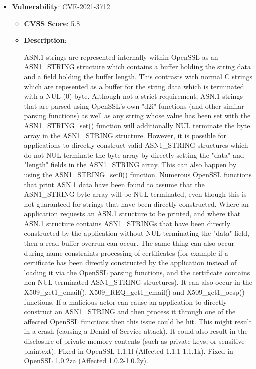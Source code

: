\documentclass{article}
\begin{document}
\begin{itemize}
        \item \textbf{Vulnerability}: CVE-2021-3712
        \begin{itemize}
            \item \textbf{CVSS Score}:  5.8 
            \item \textbf{Description}:
            \parbox[t]{0.9\linewidth}{
                \ttfamily ASN.1 strings are represented internally within OpenSSL as an ASN1\_STRING structure which contains a buffer holding the string data and a field holding the buffer length. This contrasts with normal C strings which are repesented as a buffer for the string data which is terminated with a NUL (0) byte. Although not a strict requirement, ASN.1 strings that are parsed using OpenSSL's own "d2i" functions (and other similar parsing functions) as well as any string whose value has been set with the ASN1\_STRING\_set() function will additionally NUL terminate the byte array in the ASN1\_STRING structure. However, it is possible for applications to directly construct valid ASN1\_STRING structures which do not NUL terminate the byte array by directly setting the "data" and "length" fields in the ASN1\_STRING array. This can also happen by using the ASN1\_STRING\_set0() function. Numerous OpenSSL functions that print ASN.1 data have been found to assume that the ASN1\_STRING byte array will be NUL terminated, even though this is not guaranteed for strings that have been directly constructed. Where an application requests an ASN.1 structure to be printed, and where that ASN.1 structure contains ASN1\_STRINGs that have been directly constructed by the application without NUL terminating the "data" field, then a read buffer overrun can occur. The same thing can also occur during name constraints processing of certificates (for example if a certificate has been directly constructed by the application instead of loading it via the OpenSSL parsing functions, and the certificate contains non NUL terminated ASN1\_STRING structures). It can also occur in the X509\_get1\_email(), X509\_REQ\_get1\_email() and X509\_get1\_ocsp() functions. If a malicious actor can cause an application to directly construct an ASN1\_STRING and then process it through one of the affected OpenSSL functions then this issue could be hit. This might result in a crash (causing a Denial of Service attack). It could also result in the disclosure of private memory contents (such as private keys, or sensitive plaintext). Fixed in OpenSSL 1.1.1l (Affected 1.1.1-1.1.1k). Fixed in OpenSSL 1.0.2za (Affected 1.0.2-1.0.2y).
            }
        \end{itemize}
    

\end{itemize}
\end{document}
